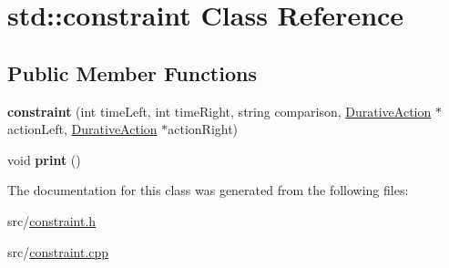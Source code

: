 \hypertarget{classstd_1_1constraint}{\section{std\+:\+:constraint Class Reference}
\label{classstd_1_1constraint}
}
\subsection*{Public Member Functions}
\begin{DoxyCompactItemize}
\item 
\hypertarget{classstd_1_1constraint_ab4b674cced2902e04f0dd6d7be7d0e13}{{\bfseries constraint} (int time\+Left, int time\+Right, string comparison, \hyperlink{classDurativeAction}{Durative\+Action} $\ast$action\+Left, \hyperlink{classDurativeAction}{Durative\+Action} $\ast$action\+Right)}\label{classstd_1_1constraint_ab4b674cced2902e04f0dd6d7be7d0e13}

\item 
\hypertarget{classstd_1_1constraint_a5efebbd0b796484d032c69dc11807919}{void {\bfseries print} ()}\label{classstd_1_1constraint_a5efebbd0b796484d032c69dc11807919}

\end{DoxyCompactItemize}


The documentation for this class was generated from the following files\+:\begin{DoxyCompactItemize}
\item 
src/\hyperlink{constraint_8h}{constraint.\+h}\item 
src/\hyperlink{constraint_8cpp}{constraint.\+cpp}\end{DoxyCompactItemize}
